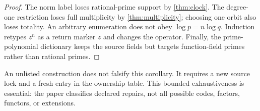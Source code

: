 \begin{proof}
The norm label loses rational-prime support by \cref{thm:clock}. The
degree-one restriction loses full multiplicity by
\cref{thm:multiplicity}; choosing one orbit also loses totality. An arbitrary
enumeration does not obey $\log p=n\log q$. Induction retypes $z^n$ as a
return marker $z$ and changes the operator. Finally, the prime-polynomial
dictionary keeps the source fields but targets function-field primes rather
than rational primes.
\end{proof}

An unlisted construction does not falsify this corollary. It requires a new
source lock and a fresh entry in the ownership table. This bounded
exhaustiveness is essential: the paper classifies declared repairs, not all
possible codes, factors, functors, or extensions.
